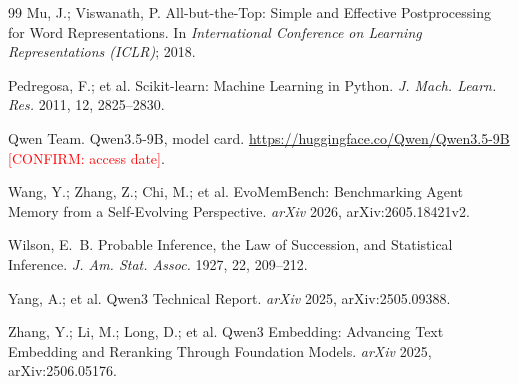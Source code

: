 \documentclass[11pt]{article}
\newcommand{\confirm}[1]{\textcolor{red}{[CONFIRM: #1]}} %
\begin{document}
\begin{thebibliography}{99}
 Mu, J.; Viswanath, P. All-but-the-Top: Simple and Effective Postprocessing for Word Representations. In \emph{International Conference on Learning Representations (ICLR)}; 2018.

 Pedregosa, F.; et al. Scikit-learn: Machine Learning in Python. \emph{J. Mach. Learn. Res.} 2011, 12, 2825--2830.

 Qwen Team. Qwen3.5-9B, model card. \url{https://huggingface.co/Qwen/Qwen3.5-9B} \confirm{access date}.

 Wang, Y.; Zhang, Z.; Chi, M.; et al. EvoMemBench: Benchmarking Agent Memory from a Self-Evolving Perspective. \emph{arXiv} 2026, arXiv:2605.18421v2.

 Wilson, E.~B. Probable Inference, the Law of Succession, and Statistical Inference. \emph{J. Am. Stat. Assoc.} 1927, 22, 209--212.

 Yang, A.; et al. Qwen3 Technical Report. \emph{arXiv} 2025, arXiv:2505.09388.

 Zhang, Y.; Li, M.; Long, D.; et al. Qwen3 Embedding: Advancing Text Embedding and Reranking Through Foundation Models. \emph{arXiv} 2025, arXiv:2506.05176.

\end{thebibliography}
\end{document}
